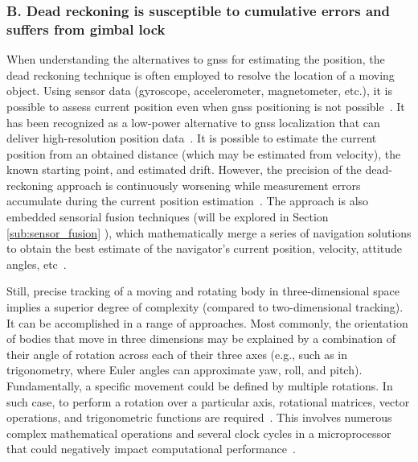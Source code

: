 \subsubsection{B. Dead reckoning is susceptible to cumulative errors and suffers from gimbal lock} %
When understanding the alternatives to \acrshort{gnss} for estimating the position, the dead reckoning technique is often employed to resolve the location of a moving object. Using sensor data (gyroscope, accelerometer, magnetometer, etc.), it is possible to assess current position even when \acrshort{gnss} positioning is not possible~\cite{omar2016integration}. It has been recognized as a low-power alternative to \acrshort{gnss} localization that can deliver high-resolution position data~\cite{dewhirst2016improving}. It is possible to estimate the current position from an obtained distance (which may be estimated from velocity), the known starting point, and estimated drift. However, the precision of the dead-reckoning approach is continuously worsening while measurement errors accumulate during the current position estimation~\cite{kao1991integration}. The approach is also embedded sensorial fusion techniques (will be explored in Section \ref{sub:sensor_fusion} ), which mathematically merge a series of navigation solutions to obtain the best estimate of the navigator's current position, velocity, attitude angles, etc~\cite{krakiwsky1988kalman}.

Still, precise tracking of a moving and rotating body in three-dimensional space implies a superior degree of complexity (compared to two-dimensional tracking). It can be accomplished in a range of approaches. Most commonly, the orientation of bodies that move in three dimensions may be explained by a combination of their angle of rotation across each of their three axes (e.g., such as in trigonometry, where Euler angles can approximate yaw, roll, and pitch). Fundamentally, a specific movement could be defined by multiple rotations. In such case, to perform a rotation over a particular axis, rotational matrices, vector operations, and trigonometric functions are required~\cite{bojanczyk1991computation}. This involves numerous complex mathematical operations and several clock cycles in a microprocessor that could negatively impact computational performance~\cite{janota2015improving}.

